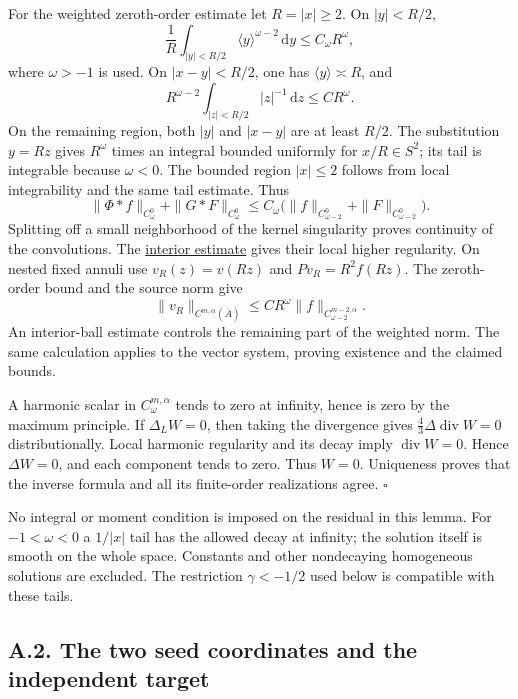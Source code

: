 \documentclass[
  english,
  11pt,
  reqno]{amsart}
\begin{document}
For the weighted zeroth-order estimate let \(R=|x|\ge2\). On
\(|y|<R/2\), \[
\frac1R\int_{|y|<R/2}
\langle y\rangle^{\omega-2}\,\mathrm dy
\le C_\omega R^\omega,
\] where \(\omega>-1\) is used. On \(|x-y|<R/2\), one has
\(\langle y\rangle\asymp R\), and \[
R^{\omega-2}\int_{|z|<R/2}|z|^{-1}\,\mathrm dz
\le C R^\omega.
\] On the remaining region, both \(|y|\) and \(|x-y|\) are at least
\(R/2\). The substitution \(y=Rz\) gives \(R^\omega\) times an integral
bounded uniformly for \(x/R\in S^2\); its tail is integrable because
\(\omega<0\). The bounded region \(|x|\le2\) follows from local
integrability and the same tail estimate. Thus \[
\|\Phi*f\|_{C^0_\omega}
+\|G*F\|_{C^0_\omega}
\le C_\omega
\bigl(\|f\|_{C^0_{\omega-2}}
+\|F\|_{C^0_{\omega-2}}\bigr).
\] Splitting off a small neighborhood of the kernel singularity proves
continuity of the convolutions. The
\hyperref[eq:online-chart-interior-schauder-input]{interior estimate}
gives their local higher regularity. On nested fixed annuli use
\(v_R(z)=v(Rz)\) and \(Pv_R=R^2f(Rz)\). The zeroth-order bound and the
source norm give \[
\|v_R\|_{C^{m,\alpha}(\overline A)}
\le C R^\omega
\|f\|_{C^{m-2,\alpha}_{\omega-2}}.
\] An interior-ball estimate controls the remaining part of the weighted
norm. The same calculation applies to the vector system, proving
existence and the claimed bounds.

A harmonic scalar in \(C^{m,\alpha}_\omega\) tends to zero at infinity,
hence is zero by the maximum principle. If \(\Delta_LW=0\), then taking
the divergence gives \(\frac43\Delta\operatorname{div}W=0\)
distributionally. Local harmonic regularity and its decay imply
\(\operatorname{div}W=0\). Hence \(\Delta W=0\), and each component
tends to zero. Thus \(W=0\). Uniqueness proves that the inverse formula
and all its finite-order realizations agree. \hfill\(\square\)

No integral or moment condition is imposed on the residual in this
lemma. For \(-1<\omega<0\) a \(1/|x|\) tail has the allowed decay at
infinity; the solution itself is smooth on the whole space. Constants
and other nondecaying homogeneous solutions are excluded. The
restriction \(\gamma<-1/2\) used below is compatible with these tails.

\subsection{A.2. The two seed coordinates and the independent
target}\label{a.2.-the-two-seed-coordinates-and-the-independent-target}\label{sec:online-chart-ambient-coordinates}
\end{document}
